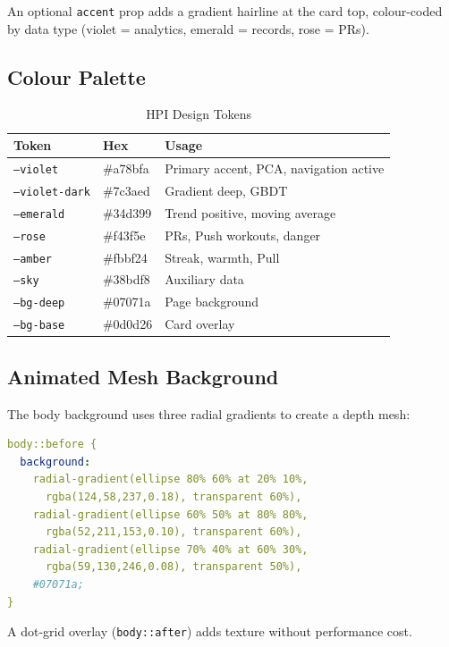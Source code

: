 \documentclass[12pt,a4paper]{report}
\begin{document}
An optional \texttt{accent} prop adds a gradient hairline at the card top,
colour-coded by data type (violet = analytics, emerald = records, rose = PRs).

\subsection{Colour Palette}

\begin{table}[h!]
\centering
\caption{HPI Design Tokens}
\begin{tabular}{lll}
\toprule
\textbf{Token} & \textbf{Hex} & \textbf{Usage} \\
\midrule
\texttt{--violet}       & \#a78bfa & Primary accent, PCA, navigation active \\
\texttt{--violet-dark}  & \#7c3aed & Gradient deep, GBDT \\
\texttt{--emerald}      & \#34d399 & Trend positive, moving average \\
\texttt{--rose}         & \#f43f5e & PRs, Push workouts, danger \\
\texttt{--amber}        & \#fbbf24 & Streak, warmth, Pull \\
\texttt{--sky}          & \#38bdf8 & Auxiliary data \\
\texttt{--bg-deep}      & \#07071a & Page background \\
\texttt{--bg-base}      & \#0d0d26 & Card overlay \\
\bottomrule
\end{tabular}
\end{table}

\subsection{Animated Mesh Background}

The body background uses three radial gradients to create a depth mesh:
\begin{lstlisting}[language=yaml,caption=Background CSS]
body::before {
  background:
    radial-gradient(ellipse 80% 60% at 20% 10%,
      rgba(124,58,237,0.18), transparent 60%),
    radial-gradient(ellipse 60% 50% at 80% 80%,
      rgba(52,211,153,0.10), transparent 60%),
    radial-gradient(ellipse 70% 40% at 60% 30%,
      rgba(59,130,246,0.08), transparent 50%),
    #07071a;
}
\end{lstlisting}

A dot-grid overlay (\texttt{body::after}) adds texture without performance cost.
\end{document}
